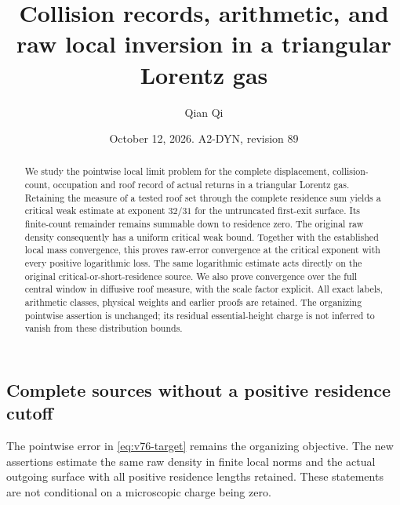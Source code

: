 \documentclass[11pt,reqno]{amsart}
\title[Collision records and raw local inversion]{Collision records, arithmetic, and raw local inversion in a triangular Lorentz gas}
\author{Qian Qi}
\date{October 12, 2026. A2-DYN, revision 89}
\numberwithin{equation}{section}
\theoremstyle{definition}
\theoremstyle{remark}\newtheorem{remark}[theorem]{Remark}
\begin{document}
\raggedbottom
\begin{abstract}
We study the pointwise local limit problem for the complete displacement,
collision-count, occupation and roof record of actual returns in a
triangular Lorentz gas. Retaining the measure of a tested roof set
through the complete residence sum yields a critical weak estimate
at exponent $32/31$ for the untruncated first-exit surface. Its
finite-count remainder remains summable down to residence zero.
The original raw density consequently has a uniform critical weak
bound. Together with the established local mass convergence, this
proves raw-error convergence at the critical exponent with every
positive logarithmic loss. The same logarithmic estimate acts directly
on the original critical-or-short-residence source. We also prove
convergence over the full central window in diffusive roof measure,
with the scale factor explicit. All exact labels, arithmetic classes,
physical weights and earlier proofs are retained. The organizing
pointwise assertion is unchanged; its residual essential-height
charge is not inferred to vanish from these distribution bounds.
\end{abstract}
\maketitle



\subsection{Complete sources without a positive residence cutoff}
The pointwise error in \eqref{eq:v76-target} remains the organizing
objective. The new assertions estimate the same raw density in finite
local norms and the actual outgoing surface with all positive residence
lengths retained. These statements are not conditional on a microscopic
charge being zero.
\end{document}

